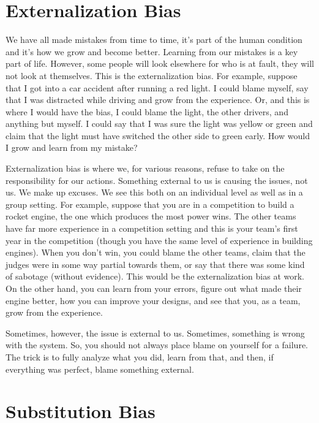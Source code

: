 \section{Externalization Bias}

We have all made mistakes from time to time, it's part of the human condition and it's how we grow and become better. Learning from our mistakes is a key part of life. However, some people will look elsewhere for who is at fault, they will not look at themselves. This is the externalization bias. For example, suppose that I got into a car accident after running a red light. I could blame myself, say that I was distracted while driving and grow from the experience. Or, and this is where I would have the bias, I could blame the light, the other drivers, and anything but myself. I could say that I was sure the light was yellow or green and claim that the light must have switched the other side to green early. How would I grow and learn from my mistake?

Externalization bias is where we, for various reasons, refuse to take on the responsibility for our actions. Something external to us is causing the issues, not us. We make up excuses. We see this both on an individual level as well as in a group setting. For example, suppose that you are in a competition to build a rocket engine, the one which produces the most power wins. The other teams have far more experience in a competition setting and this is your team's first year in the competition (though you have the same level of experience in building engines). When you don't win, you could blame the other teams, claim that the judges were in some way partial towards them, or say that there was some kind of sabotage (without evidence). This would be the externalization bias at work. On the other hand, you can learn from your errors, figure out what made their engine better, how you can improve your designs, and see that you, as a team, grow from the experience.

Sometimes, however, the issue is external to us. Sometimes, something is wrong with the system. So, you should not always place blame on yourself for a failure. The trick is to fully analyze what you did, learn from that, and then, if everything was perfect, blame something external. 

\section{Substitution Bias}

